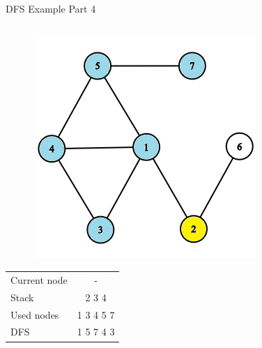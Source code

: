 \documentclass[aspectratio=169]{beamer}%
\begin{document}
\begin{frame}{DFS Example Part 4}
\begin{columns}
\begin{column}{0.32\textwidth}
\begin{figure}[!ht]
                \centering
                \includegraphics[width=0.9\linewidth]{dfs 12.png}
            \end{figure}
            \begin{table}[ht]
                \centering
                \begin{tabular}{l c}
                    Current node & -\\
                    Stack & 2 3 4\\ 
                    Used nodes & 1 3 4 5 7\\
                    DFS & 1 5 7 4 3 
                \end{tabular}
            \end{table}
        \end{column}
    \end{columns}
\end{frame}
\end{document}
